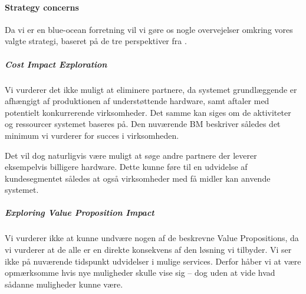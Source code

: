 \paragraph{Strategy concerns}

Da vi er en blue-ocean forretning vil vi gøre os nogle overvejelser omkring vores valgte strategi, baseret på de tre perspektiver fra \cite[p. 231]{osterwalder2009business}.

\subparagraph{Cost Impact Exploration}
Vi vurderer det ikke muligt at eliminere partnere, da systemet grundlæggende er afhængigt af produktionen af understøttende hardware, samt aftaler med potentielt konkurrerende virksomheder.
Det samme kan siges om de aktiviteter og ressourcer systemet baseres på.
Den nuværende BM beskriver således det minimum vi vurderer for succes i virksomheden.

Det vil dog naturligvis være muligt at søge andre partnere der leverer eksempelvis billigere hardware.
Dette kunne føre til en udvidelse af kundesegmentet således at også virksomheder med få midler kan anvende systemet.


\subparagraph{Exploring Value Proposition Impact}
Vi vurderer ikke at kunne undvære nogen af de beskrevne Value Propositions, da vi vurderer at de alle er en direkte konsekvens af den løsning vi tilbyder.
Vi ser ikke på nuværende tidspunkt udvidelser i mulige services.
Derfor håber vi at være opmærksomme hvis nye muligheder skulle vise sig -- dog uden at vide hvad sådanne muligheder kunne være.


